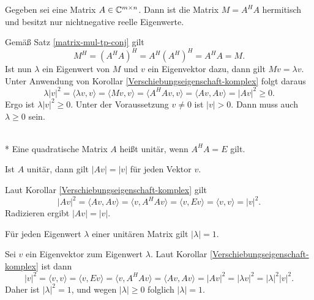 \begin{Satz}
Gegeben sei eine Matrix $A\in\mathbb C^{m\times n}$.
Dann ist die Matrix $M=A^H A$ hermitisch und besitzt nur
nichtnegative reelle Eigenwerte.
\end{Satz}
\begin{Beweis}
Gemäß Satz \ref{matrix-mul-tp-conj} gilt
\begin{equation}
M^H = (A^H A)^H = A^H (A^H)^H = A^H A = M.
\end{equation}
Ist nun $\lambda$ ein Eigenwert von $M$ und $v$ ein Eigenvektor dazu,
dann gilt $Mv=\lambda v$. Unter Anwendung von Korollar
\ref{Verschiebungseigenschaft-komplex} folgt daraus
\begin{equation}
\lambda |v|^2 = \langle\lambda v,v\rangle
= \langle Mv,v\rangle = \langle A^H Av,v\rangle
= \langle Av,Av\rangle = |Av|^2\ge 0.
\end{equation}
Ergo ist $\lambda|v|^2\ge 0$. Unter der Voraussetzung $v\ne 0$
ist $|v|>0$. Dann muss auch $\lambda\ge 0$ sein.\;\qedsymbol
\end{Beweis}

\begin{Definition}\mbox{}\\*
Eine quadratische Matrix $A$ heißt unitär, wenn $A^H A=E$ gilt.
\end{Definition}

\begin{Korollar}
Ist $A$ unitär, dann gilt $|Av|=|v|$ für jeden Vektor $v$.
\end{Korollar}
\begin{Beweis}
Laut Korollar \ref{Verschiebungseigenschaft-komplex} gilt
\[|Av|^2 = \langle Av,Av\rangle = \langle v,A^H Av\rangle
= \langle v,Ev\rangle = \langle v,v\rangle = |v|^2.\]
Radizieren ergibt $|Av|=|v|$.\;\qedsymbol
\end{Beweis}

\begin{Korollar}
Für jeden Eigenwert $\lambda$ einer unitären Matrix gilt $|\lambda|=1$.
\end{Korollar}
\begin{Beweis}
Sei $v$ ein Eigenvektor zum Eigenwert $\lambda$. Laut Korollar
\ref{Verschiebungseigenschaft-komplex} ist dann
\[|v|^2 = \langle v,v\rangle = \langle v,Ev\rangle
= \langle v,A^H Av\rangle = \langle Av,Av\rangle
= |Av|^2 = |\lambda v|^2
= |\lambda|^2 |v|^2.\]
Daher ist $|\lambda|^2=1$, und wegen $|\lambda|\ge 0$ folglich $|\lambda|=1$.\;\qedsymbol
\end{Beweis}



